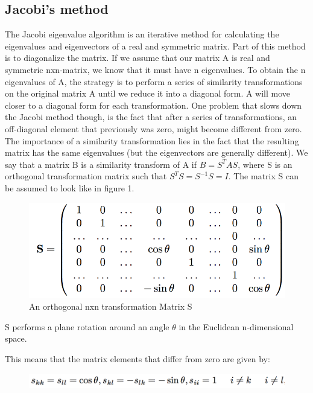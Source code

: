 \documentclass[twocolumn]{article}
\begin{document}
\subsection*{Jacobi's method}
The Jacobi eigenvalue algorithm is an iterative method for calculating the eigenvalues and eigenvectors of a real and symmetric matrix. Part of this method is to diagonalize the matrix.
If we assume that our matrix A is real and symmetric nxn-matrix, we know that it must have n eigenvalues.
To obtain the n eigenvalues of A, the strategy is to perform a series of similarity transformations on the original matrix A until we reduce it into a diagonal form. A will move closer to a diagonal form for each transformation. One problem that slows down the Jacobi method though, is the fact that after a series of transformations, an off-diagonal element that previously was zero, might become different from zero. The importance of a similarity transformation lies in the fact that the resulting matrix has the same eigenvalues (but the eigenvectors are generally different).
\newline
We say that a matrix B is a similarity transform of A if $B = S^{T}AS$, where S is an orthogonal transformation matrix such that $S^T S = S^{-1}S = I$. The matrix S can be assumed to look like in figure 1.

\begin{figure}[h!]
  \caption{An orthogonal nxn transformation Matrix S}
  \includegraphics[width=\linewidth]{pict_1.png}
\end{figure}

S performs a plane rotation around an angle $\theta$ in the Euclidean n-dimensional space.
\newline

This means that the matrix elements that differ from zero are given by:
\begin{figure}[h!]

\includegraphics[width=\linewidth]{pict_2.png}
\end{figure}
\end{document}
